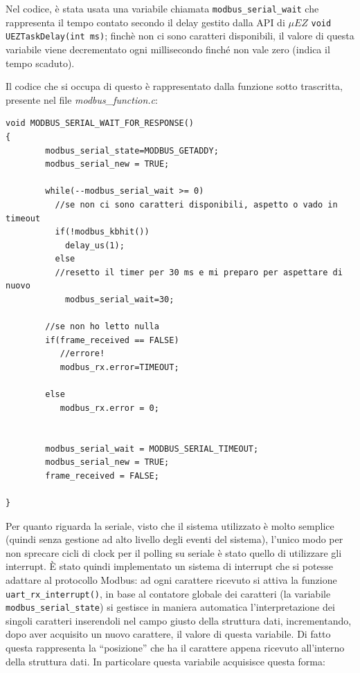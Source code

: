 \documentclass[a4paper,titlepage]{book}
\begin{document}
Nel codice, è stata usata una variabile chiamata \lstinline!modbus_serial_wait! che rappresenta il tempo contato secondo il delay gestito dalla API di $\mu EZ$ \lstinline!void UEZTaskDelay(int ms)!; finchè non ci sono caratteri disponibili, il valore di questa variabile viene decrementato ogni millisecondo finché non vale zero (indica il tempo scaduto).

Il codice che si occupa di questo è rappresentato dalla funzione sotto trascritta, presente nel file \textit{modbus\_function.c}:

\begin{lstlisting}[showlines=true,firstline=1, firstnumber=110]
void MODBUS_SERIAL_WAIT_FOR_RESPONSE()
{
        modbus_serial_state=MODBUS_GETADDY;
        modbus_serial_new = TRUE;

        while(--modbus_serial_wait >= 0)
          //se non ci sono caratteri disponibili, aspetto o vado in timeout
          if(!modbus_kbhit())
            delay_us(1);
          else
          //resetto il timer per 30 ms e mi preparo per aspettare di nuovo
            modbus_serial_wait=30;

        //se non ho letto nulla
        if(frame_received == FALSE)
           //errore!
           modbus_rx.error=TIMEOUT;

        else
           modbus_rx.error = 0;


        modbus_serial_wait = MODBUS_SERIAL_TIMEOUT;
        modbus_serial_new = TRUE;
        frame_received = FALSE;

}
\end{lstlisting}

Per quanto riguarda la seriale, visto che il sistema utilizzato è molto semplice (quindi senza gestione ad alto livello degli eventi del sistema), l'unico modo per non sprecare cicli di clock per il polling su seriale è stato quello di utilizzare gli interrupt. È stato quindi implementato un sistema di interrupt che si potesse adattare al protocollo Modbus: ad ogni carattere ricevuto si attiva la funzione \lstinline!uart_rx_interrupt()!,  in base al contatore globale dei caratteri (la variabile \lstinline!modbus_serial_state!) si gestisce in maniera automatica l'interpretazione dei singoli caratteri inserendoli nel campo giusto della struttura dati, incrementando, dopo aver acquisito un nuovo carattere, il valore di questa variabile. Di fatto questa rappresenta la ``posizione'' che ha il carattere appena ricevuto all'interno della struttura dati.
In particolare questa variabile acquisisce questa forma:
\end{document}
